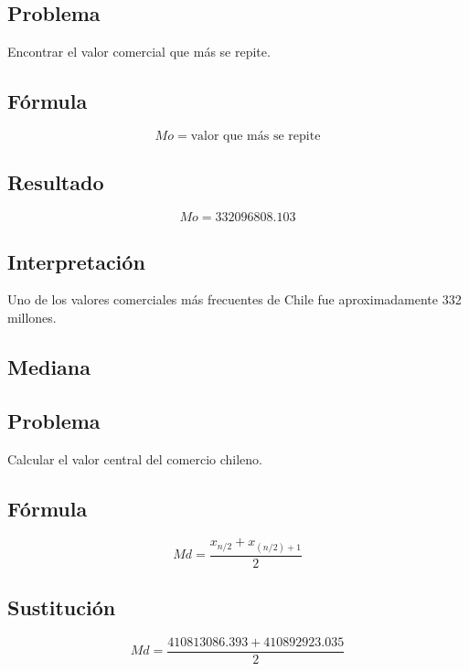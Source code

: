 \documentclass[12pt]{article}
\begin{document}
\subsection*{Problema}

Encontrar el valor comercial que más se repite.

\subsection*{Fórmula}

\[
Mo = \text{valor que más se repite}
\]

\subsection*{Resultado}

\[
Mo = 332096808.103
\]

\subsection*{Interpretación}

Uno de los valores comerciales más frecuentes de Chile fue aproximadamente 332 millones.


\subsection{Mediana}

\subsection*{Problema}

Calcular el valor central del comercio chileno.

\subsection*{Fórmula}

\[
Md = \frac{x_{n/2}+x_{(n/2)+1}}{2}
\]

\subsection*{Sustitución}

\[
Md = \frac{410813086.393 + 410892923.035}{2}
\]
\end{document}
